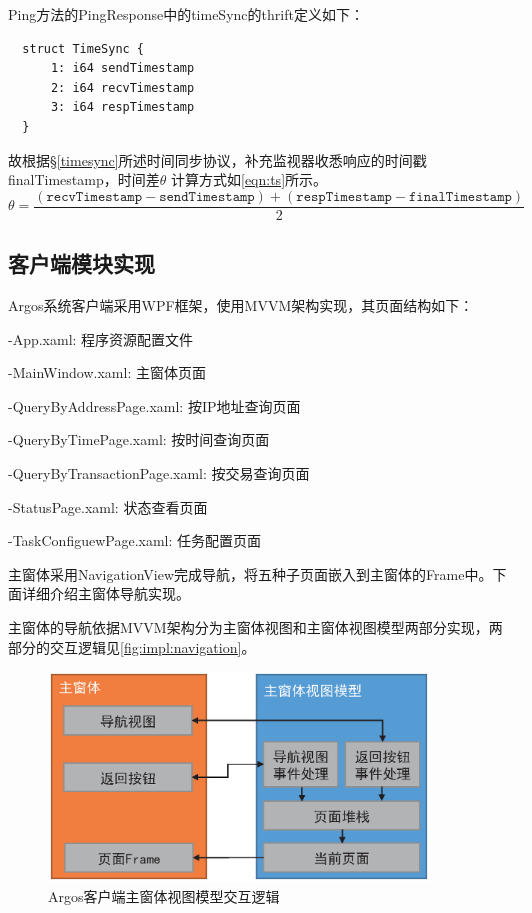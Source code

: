 \documentclass[supercite]{HustGraduPaper}
\newcommand{\xfig}[3]{
  \begin{figure}[htb]
    \centering
    #3
    \caption{#2}
    \label{fig:#1}
  \end{figure}
}
\newcommand{\rfig}[1]{\autoref{fig:#1}}
\newcommand{\reqn}[1]{\autoref{eqn:#1}}
\theoremstyle{definition}
\begin{document}
Ping方法的PingResponse中的timeSync的thrift定义如下：
\begin{verbatim}
  struct TimeSync {
      1: i64 sendTimestamp
      2: i64 recvTimestamp
      3: i64 respTimestamp
  }
\end{verbatim}

故根据\S \ref{timesync}所述时间同步协议，补充监视器收悉响应的时间戳finalTimestamp，时间差$\theta$ 计算方式如\reqn{ts}所示。
\begin{equation}
  \theta=\frac{(\texttt{recvTimestamp}-\texttt{sendTimestamp} )+(\texttt{respTimestamp}-\texttt{finalTimestamp})}{2}\label{eqn:ts}
\end{equation}
\subsection{客户端模块实现}
Argos系统客户端采用WPF框架，使用MVVM架构实现，其页面结构如下：

-App.xaml: 程序资源配置文件  

-MainWindow.xaml: 主窗体页面

\qquad -QueryByAddressPage.xaml: 按IP地址查询页面

\qquad -QueryByTimePage.xaml: 按时间查询页面

\qquad -QueryByTransactionPage.xaml: 按交易查询页面

\qquad -StatusPage.xaml: 状态查看页面

\qquad -TaskConfiguewPage.xaml: 任务配置页面

主窗体采用NavigationView完成导航，将五种子页面嵌入到主窗体的Frame中。下面详细介绍主窗体导航实现。

主窗体的导航依据MVVM架构分为主窗体视图和主窗体视图模型两部分实现，两部分的交互逻辑见\rfig{impl:navigation}。

\xfig{impl:navigation}{Argos客户端主窗体视图模型交互逻辑}{
  \includegraphics[width=0.9\textwidth]{images/4.4-navigation.ps}
}
\end{document}
